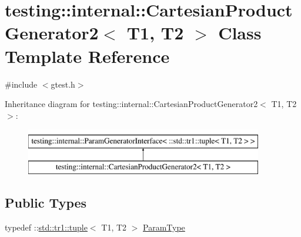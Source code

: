 \hypertarget{classtesting_1_1internal_1_1_cartesian_product_generator2}{\section{testing\-:\-:internal\-:\-:Cartesian\-Product\-Generator2$<$ T1, T2 $>$ Class Template Reference}
\label{classtesting_1_1internal_1_1_cartesian_product_generator2}
}


{\ttfamily \#include $<$gtest.\-h$>$}

Inheritance diagram for testing\-:\-:internal\-:\-:Cartesian\-Product\-Generator2$<$ T1, T2 $>$\-:\begin{figure}[H]
\begin{center}
\leavevmode
\includegraphics[height=2.000000cm]{classtesting_1_1internal_1_1_cartesian_product_generator2}
\end{center}
\end{figure}
\subsection*{Public Types}
\begin{DoxyCompactItemize}
\item 
typedef \-::\hyperlink{classstd_1_1tr1_1_1tuple}{std\-::tr1\-::tuple}$<$ T1, T2 $>$ \hyperlink{classtesting_1_1internal_1_1_cartesian_product_generator2_a036b6f14a61a69fac5d21dd7ff5b8913}{Param\-Type}
\end{DoxyCompactItemize}
